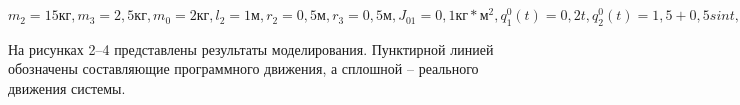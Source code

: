  $m_2=15кг, m_3=2,5кг, m_0 = 2кг, l_2 = 1м, r_2=0,5м, r_3 = 0,5м, J_{01} = 0,1 кг * м^2, q_1^0(t) = 0,2t, q_2^0(t) = 1,5 + 0,5 sin t, q_3^0(t) = 0,5 sin(0,5 t).$
 
 На рисунках 2–4 представлены результаты моделирования. Пунктирной линией обозначены  составляющие программного движения, а сплошной – реального движения системы.